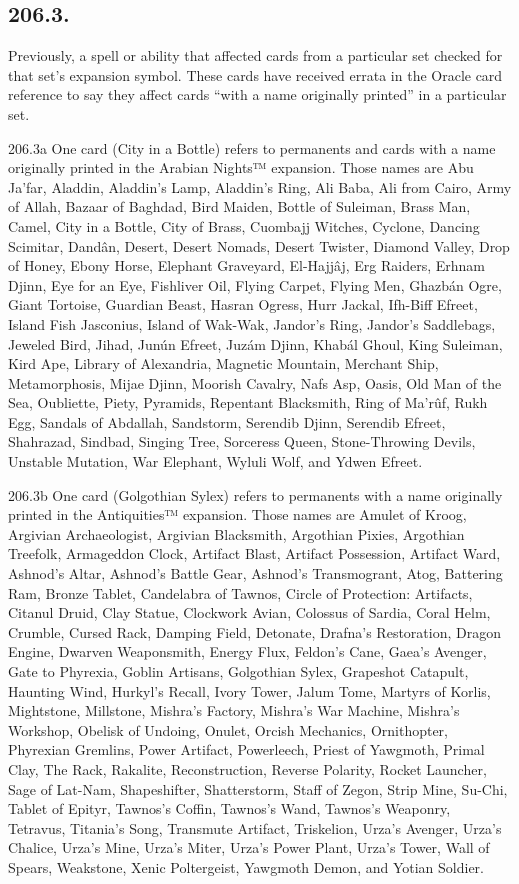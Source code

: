 \subsection*{206.3.}
Previously, a spell or ability that affected cards from a particular set checked for that set’s expansion symbol. These cards have received errata in the Oracle card reference to say they affect cards “with a name originally printed” in a particular set.

206.3a One card (City in a Bottle) refers to permanents and cards with a name originally printed in the Arabian Nights™ expansion. Those names are Abu Ja’far, Aladdin, Aladdin’s Lamp, Aladdin’s Ring, Ali Baba, Ali from Cairo, Army of Allah, Bazaar of Baghdad, Bird Maiden, Bottle of Suleiman, Brass Man, Camel, City in a Bottle, City of Brass, Cuombajj Witches, Cyclone, Dancing Scimitar, Dandân, Desert, Desert Nomads, Desert Twister, Diamond Valley, Drop of Honey, Ebony Horse, Elephant Graveyard, El-Hajjâj, Erg Raiders, Erhnam Djinn, Eye for an Eye, Fishliver Oil, Flying Carpet, Flying Men, Ghazbán Ogre, Giant Tortoise, Guardian Beast, Hasran Ogress, Hurr Jackal, Ifh-Biff Efreet, Island Fish Jasconius, Island of Wak-Wak, Jandor’s Ring, Jandor’s Saddlebags, Jeweled Bird, Jihad, Junún Efreet, Juzám Djinn, Khabál Ghoul, King Suleiman, Kird Ape, Library of Alexandria, Magnetic Mountain, Merchant Ship, Metamorphosis, Mijae Djinn, Moorish Cavalry, Nafs Asp, Oasis, Old Man of the Sea, Oubliette, Piety, Pyramids, Repentant Blacksmith, Ring of Ma’rûf, Rukh Egg, Sandals of Abdallah, Sandstorm, Serendib Djinn, Serendib Efreet, Shahrazad, Sindbad, Singing Tree, Sorceress Queen, Stone-Throwing Devils, Unstable Mutation, War Elephant, Wyluli Wolf, and Ydwen Efreet.

206.3b One card (Golgothian Sylex) refers to permanents with a name originally printed in the Antiquities™ expansion. Those names are Amulet of Kroog, Argivian Archaeologist, Argivian Blacksmith, Argothian Pixies, Argothian Treefolk, Armageddon Clock, Artifact Blast, Artifact Possession, Artifact Ward, Ashnod’s Altar, Ashnod’s Battle Gear, Ashnod’s Transmogrant, Atog, Battering Ram, Bronze Tablet, Candelabra of Tawnos, Circle of Protection: Artifacts, Citanul Druid, Clay Statue, Clockwork Avian, Colossus of Sardia, Coral Helm, Crumble, Cursed Rack, Damping Field, Detonate, Drafna’s Restoration, Dragon Engine, Dwarven Weaponsmith, Energy Flux, Feldon’s Cane, Gaea’s Avenger, Gate to Phyrexia, Goblin Artisans, Golgothian Sylex, Grapeshot Catapult, Haunting Wind, Hurkyl’s Recall, Ivory Tower, Jalum Tome, Martyrs of Korlis, Mightstone, Millstone, Mishra’s Factory, Mishra’s War Machine, Mishra’s Workshop, Obelisk of Undoing, Onulet, Orcish Mechanics, Ornithopter, Phyrexian Gremlins, Power Artifact, Powerleech, Priest of Yawgmoth, Primal Clay, The Rack, Rakalite, Reconstruction, Reverse Polarity, Rocket Launcher, Sage of Lat-Nam, Shapeshifter, Shatterstorm, Staff of Zegon, Strip Mine, Su-Chi, Tablet of Epityr, Tawnos’s Coffin, Tawnos’s Wand, Tawnos’s Weaponry, Tetravus, Titania’s Song, Transmute Artifact, Triskelion, Urza’s Avenger, Urza’s Chalice, Urza’s Mine, Urza’s Miter, Urza’s Power Plant, Urza’s Tower, Wall of Spears, Weakstone, Xenic Poltergeist, Yawgmoth Demon, and Yotian Soldier.

